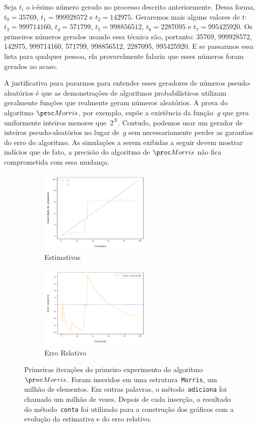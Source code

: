 Seja $t_i$ o i-ésimo número gerado no processo descrito anteriormente. Dessa forma, $t_0 = 35769$, $t_1 = 999928572$ e 
$t_2 = 142975$. Geraremos mais alguns valores de $t$: $t_3 = 999714160$, $t_4 = 571799$, $t_5 = 998856512$, 
$t_6 = 2287095$ e $t_7 = 995425920$. Os primeiros números gerados usando essa técnica são, portanto: 35769, 999928572, 
142975, 999714160, 571799, 998856512, 2287095, 995425920. E se passarmos essa lista para qualquer pessoa, ela 
provavelmente falaria que esses números foram gerados ao acaso.

A justificativa para pararmos para entender esses geradores de números pseudo-aleatórios é que as demonstrações de 
algoritmos probabilísticos utilizam geralmente funções que realmente geram números aleatórios. A prova do algoritmo 
$\Morris$, por exemplo, supõe a existência da função~$g$ que gera uniformente inteiros menores que~$2^X$. Contudo, 
podemos usar um gerador de inteiros pseudo-aleatórios no lugar de~$g$ sem necessariamente perder as garantias do erro
do algoritmo. As simulações a serem exibidas a seguir devem mostrar indícios que de fato, a precisão do algoritmo de 
$\Morris$ não fica comprometida com essa mudança.

\begin{figure}
  \centering
  \begin{subfigure}{.5\textwidth}
    \centering
    \includegraphics[width=\linewidth, height=4cm]{figuras/morris_first.png}
    \caption{Estimativas}
    \label{fig:morris:100}
  \end{subfigure}%
  \begin{subfigure}{.5\textwidth}
    \centering
    \includegraphics[width=\linewidth, height=4cm]{figuras/morris_erro_first.png}
    \caption{Erro Relativo}
    \label{fig:morris:error:100}
  \end{subfigure}
  \caption{Primeiras iterações do primeiro experimento do algoritmo~$\Morris$. Foram inseridos em uma 
  estrutura~\texttt{Morris}, um milhão de elementos. Em outras palavras, o método~\texttt{adiciona} foi chamado um 
  milhão de vezes. Depois de cada inserção, o resultado do método~\texttt{conta} foi utilizado para a construção dos 
  gráficos com a evolução da estimativa e do erro relativo.}
\end{figure}

